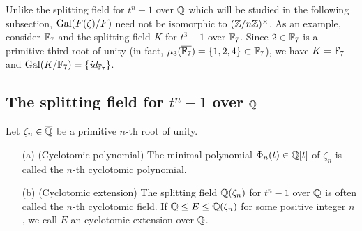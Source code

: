 \begin{rmk}
    Unlike the splitting field for $t^n-1$ over ${\mathbb{Q}}$ which will be studied in the following subsection, ${\textrm{Gal}({F(\zeta)/F})}$ need not be isomorphic to $({\mathbb{Z}}/n{\mathbb{Z}})^\times$.
    As an example, consider ${\mathbb{F}}_7$ and the splitting field $K$ for $t^3-1$ over ${\mathbb{F}}_7$.
    Since $2\in{\mathbb{F}}_7$ is a primitive third root of unity (in fact, $\mu_3(\overline{{\mathbb{F}}_7})=\{1, 2, 4\}\subset{\mathbb{F}}_7$), we have $K={\mathbb{F}}_7$ and ${\textrm{Gal}({K/{\mathbb{F}}_7})}=\{\textit{id}_{{\mathbb{F}}_7}\}$.
\end{rmk}

\subsection{The splitting field for $t^n-1$ over ${\mathbb{Q}}$}

\begin{defi}
    Let $\zeta_n\in\overline{{\mathbb{Q}}}$ be a primitive $n$-th root of unity.
    \begin{enumerate}
        \item[(a)]
        {
            (Cyclotomic polynomial)
            The minimal polynomial $\Phi_n(t)\in{\mathbb{Q}}[t]$ of $\zeta_n$ is called the $n$-th cyclotomic polynomial.
        }
        \item[(b)]
        {
            (Cyclotomic extension)
            The splitting field ${\mathbb{Q}}(\zeta_n)$ for $t^n-1$ over ${\mathbb{Q}}$ is often called the $n$-th cyclotomic field.
            If ${\mathbb{Q}}\leq E\leq {\mathbb{Q}}(\zeta_n)$ for some positive integer $n$, we call $E$ an cyclotomic extension over ${\mathbb{Q}}$.
        }
    \end{enumerate}
\end{defi}
